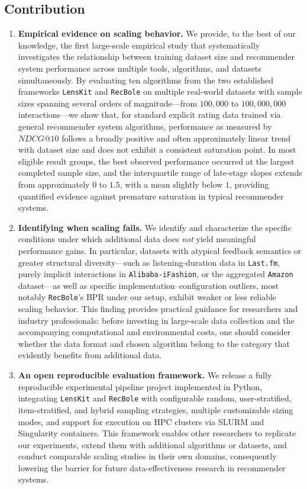 \documentclass[12pt,a4paper]{article}
\begin{document}
\subsection{Contribution}
\begin{enumerate}
    \item \textbf{Empirical evidence on scaling behavior.} We provide, to the best of our knowledge, the first large-scale empirical study that systematically investigates the relationship between training dataset size and recommender system performance across multiple tools, algorithms, and datasets simultaneously. By evaluating ten algorithms from the two established frameworks \texttt{LensKit} and \texttt{RecBole} on multiple real-world datasets with sample sizes spanning several orders of magnitude—from $100{,}000$ to $100{,}000{,}000$ interactions—we show that, for standard explicit rating data trained via general recommender system algorithms, performance as measured by $NDCG@10$ follows a broadly positive and often approximately linear trend with dataset size and does not exhibit a consistent saturation point. In most eligible result groups, the best observed performance occurred at the largest completed sample size, and the interquartile range of late-stage slopes extends from approximately $0$ to $1.5$, with a mean slightly below $1$, providing quantified evidence against premature saturation in typical recommender systems.

    \item \textbf{Identifying when scaling fails.} We identify and characterize the specific conditions under which additional data does \emph{not} yield meaningful performance gains. In particular, datasets with atypical feedback semantics or greater structural diversity—such as listening-duration data in \texttt{Last.fm}, purely implicit interactions in \texttt{Alibaba-iFashion}, or the aggregated \texttt{Amazon} dataset—as well as specific implementation--configuration outliers, most notably \texttt{RecBole}'s BPR under our setup, exhibit weaker or less reliable scaling behavior. This finding provides practical guidance for researchers and industry professionals: before investing in large-scale data collection and the accompanying computational and environmental costs, one should consider whether the data format and chosen algorithm belong to the category that evidently benefits from additional data.

    \item \textbf{An open reproducible evaluation framework.} We release a fully reproducible experimental pipeline project implemented in Python, integrating \texttt{LensKit} and \texttt{RecBole} with configurable random, user-stratified, item-stratified, and hybrid sampling strategies, multiple customizable sizing modes, and support for execution on HPC clusters via SLURM and Singularity containers. This framework enables other researchers to replicate our experiments, extend them with additional algorithms or datasets, and conduct comparable scaling studies in their own domains, consequently lowering the barrier for future data-effectiveness research in recommender systems.
\end{enumerate}
\end{document}
